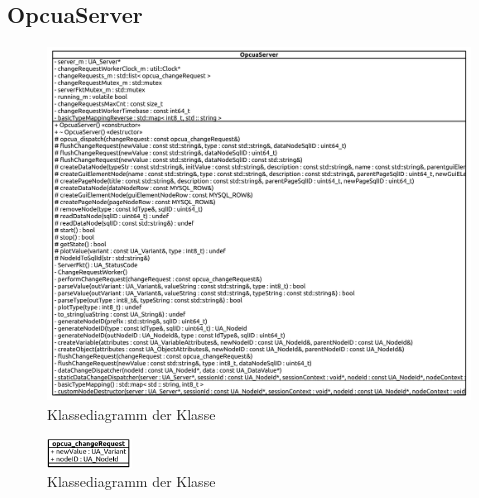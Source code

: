 \subsection{OpcuaServer}
\begin{figure}[ht]
  \centering
  \includegraphics[width=\textwidth]{content/hauptteil/umsetzungPoC/backend/uml/classesOfOverview/OpcuaServer.pdf}
  \caption{Klassediagramm der Klasse }
  \label{fig:backend:classDiag:OpcuaServer}
\end{figure}
\begin{figure}[ht]
  \centering
  \includegraphics[width=0.2\textwidth]{content/hauptteil/umsetzungPoC/backend/uml/classesOfOverview/opcua_changeRequest.pdf}
  \caption{Klassediagramm der Klasse }
  \label{fig:backend:classDiag:opcuaCR}
\end{figure}
